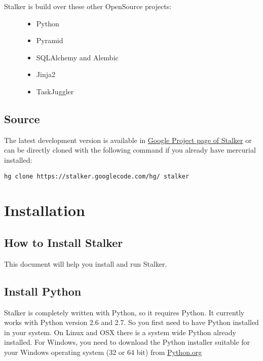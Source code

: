 \documentclass[a4paper,10pt,english]{sphinxmanual}
\begin{document}
\begin{description}
\item[{Stalker is build over these other OpenSource projects:}] \leavevmode\begin{itemize}
\item {} 
Python

\item {} 
Pyramid

\item {} 
SQLAlchemy and Alembic

\item {} 
Jinja2

\item {} 
TaskJuggler

\end{itemize}

\end{description}


\section{Source}
\label{about:source}
The latest development version is available in \href{http://code.google.com/p/stalker/}{Google Project page of
Stalker} or can be directly cloned with the following command if you already
have mercurial installed:

\begin{Verbatim}[commandchars=\\\{\}]
hg clone https://stalker.googlecode.com/hg/ stalker
\end{Verbatim}


\chapter{Installation}
\label{installation:installation-toplevel}\label{installation:google-project-page-of-stalker}\label{installation::doc}\label{installation:installation}

\section{How to Install Stalker}
\label{installation:how-to-install-stalker}
This document will help you install and run Stalker.


\section{Install Python}
\label{installation:install-python}
Stalker is completely written with Python, so it requires Python. It currently
works with Python version 2.6 and 2.7. So you first need to have Python
installed in your system. On Linux and OSX there is a system wide Python
already installed. For Windows, you need to download the Python installer
suitable for your Windows operating system (32 or 64 bit) from \href{http://www.python.org/}{Python.org}
\end{document}
